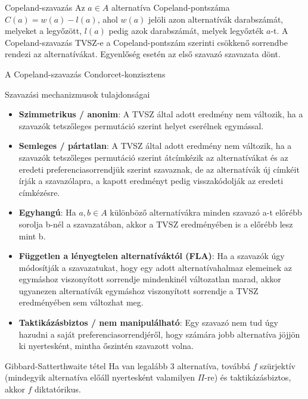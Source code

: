 	\begin{definition}{Copeland-szavazás}{}
		Az $a \in A$ alternatíva Copeland-pontszáma $C(a) = w(a) - l(a)$, ahol $w(a)$ jelöli azon alternatívák darabszámát, melyeket a legyőzött, $l(a)$ pedig azok darabszámát, melyek legyőzték $a$-t. A Copeland-szavazás TVSZ-e a Copeland-pontszám szerinti csökkenő sorrendbe rendezi
		az alternatívákat. Egyenlőség esetén az első szavazó szavazata dönt.
	\end{definition}
	
	\begin{theorem}{}{}
		A Copeland-szavazás Condorcet-konzisztens
	\end{theorem}
	
	\begin{observation}{Szavazási mechanizmusok tulajdonságai}{}
		\begin{itemize}
			\item \textbf{Szimmetrikus / anonim}: A TVSZ által adott eredmény nem változik, ha a szavazók tetszőleges permutáció szerint helyet cserélnek egymással.
			\item \textbf{Semleges / pártatlan}: A TVSZ által adott eredmény nem változik, ha a szavazók tetszőleges permutáció szerint átcímkézik az alternatívákat és az eredeti preferenciasorrendjük szerint
			szavaznak, de az alternatívák új címkéit írják a szavazólapra, a kapott eredményt pedig visszakódolják az eredeti címkézésre.
			\item \textbf{Egyhangú}: Ha $a, b \in A$ különböző alternatívákra minden szavazó a-t előrébb sorolja b-nél a
			szavazatában, akkor a TVSZ eredményében is a előrébb lesz mint b.
			\item \textbf{Független a lényegtelen alternatíváktól (FLA)}: Ha a szavazók úgy módosítják a szavazatukat, hogy egy adott alternatívahalmaz elemeinek az egymáshoz viszonyított sorrendje mindenkinél változatlan marad, akkor ugyanezen alternatívák egymáshoz viszonyított sorrendje a
			TVSZ eredményében sem változhat meg.
			\item \textbf{Taktikázásbiztos / nem manipulálható}: Egy szavazó nem tud úgy hazudni a saját preferenciasorrendjéről, hogy számára jobb alternatíva jöjjön ki nyertesként, mintha őszintén szavazott
			volna.
		\end{itemize}
	\end{observation}

	\begin{theorem}{Gibbard-Satterthwaite tétel}{}
		Ha van legalább 3 alternatíva, továbbá $f$ szürjektív (mindegyik
		alternatíva előáll nyertesként valamilyen $\Pi$-re) és taktikázásbiztos, akkor $f$ diktatórikus.
	\end{theorem}
	
